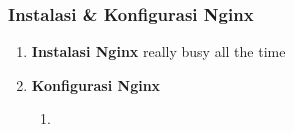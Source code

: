 \subsubsection{Instalasi \& Konfigurasi \textbf{Nginx}}

	\begin{enumerate}[label={}]
		
		\item \textbf{Instalasi \textbf{Nginx}}
			really busy all the time
		\item 
		\textbf{Konfigurasi \textbf{Nginx}}
		\\
			\begin{enumerate}[label=\roman*]
				\item \mylipsum				
			\end{enumerate}
	\end{enumerate}